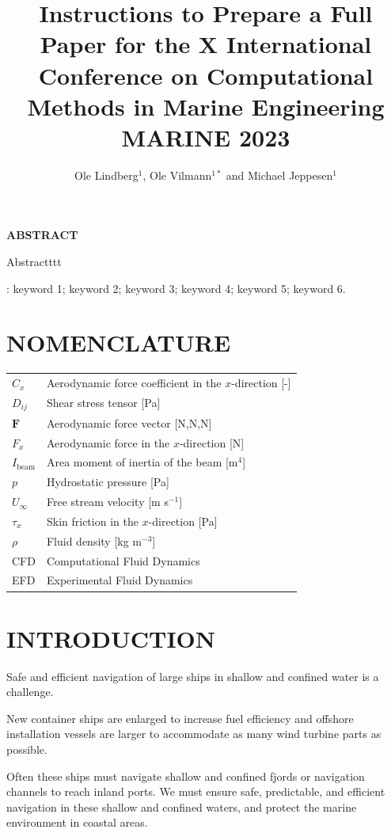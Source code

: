 \documentclass[A4paper,11pt]{marine_2023_Paper}
\title{Instructions to Prepare a Full Paper for the X International Conference on Computational Methods in Marine Engineering MARINE 2023}
\author{Ole Lindberg$^{1}$, Ole Vilmann$^{1*}$ and Michael Jeppesen$^{1}$}
\begin{document}
\maketitle
\thispagestyle{empty}
\setlength{\parskip}{0.3cm}

\begin{center}{\bf ABSTRACT}\end{center}

Abstractttt

: keyword 1; keyword 2; keyword 3; keyword 4; keyword 5; keyword 6.

\section*{NOMENCLATURE}

\begin{tabular}{ll}
 $C_x$ & Aerodynamic force coefficient in the $x$-direction [-]\\
 $D_{ij}$ & Shear stress tensor [Pa]\\
 $\boldsymbol{F}$ & Aerodynamic force vector [N,N,N]\\
 $F_x$ & Aerodynamic force in the $x$-direction [N]\\
 $I_{\mathrm{beam}}$ & Area moment of inertia of the beam [m${}^{4}$]\\
 $p$ & Hydrostatic pressure [Pa]\\
 $U_{\infty }$ & Free stream velocity [m s${}^{-1}$]\\
${\tau }_x$ & Skin friction in the $x$-direction [Pa]\\
 $\rho $ & Fluid density [kg m${}^{-3}$]\\
 CFD &Computational Fluid Dynamics\\
 EFD &Experimental Fluid Dynamics
\end{tabular}

\section{INTRODUCTION}

Safe and efficient navigation of large ships in shallow and confined water is a challenge. 

New container ships are enlarged to increase fuel efficiency and offshore installation vessels are larger to accommodate as many wind turbine parts as possible. 

Often these ships must navigate shallow and confined fjords or navigation channels to reach inland ports. We must ensure safe, predictable, and efficient navigation in these shallow and confined waters, and protect the marine environment in coastal areas. 
\end{document}
